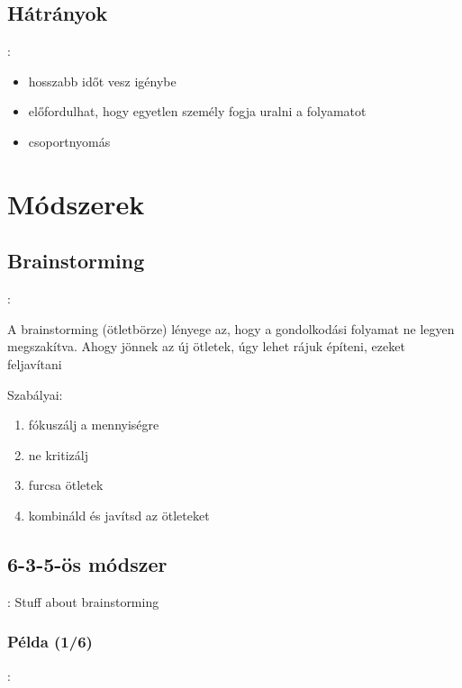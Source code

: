 \documentclass{beamer}
\begin{document}
\subsection{Hátrányok}
\begin{frame}{\secname : \subsecname}
    \begin{itemize}
        \item hosszabb időt vesz igénybe
        \item előfordulhat, hogy egyetlen személy fogja uralni a folyamatot
        \item csoportnyomás
    \end{itemize}
\end{frame}


\section{Módszerek}

\subsection{Brainstorming}
\begin{frame}{\secname : \subsecname}

A brainstorming (ötletbörze) lényege az, hogy a gondolkodási folyamat ne legyen megszakítva. Ahogy jönnek az új ötletek, úgy lehet rájuk építeni,
ezeket feljavítani

Szabályai:
\begin{enumerate}
    \item fókuszálj a mennyiségre
    \item ne kritizálj
    \item furcsa ötletek 
    \item kombináld és javítsd az ötleteket
\end{enumerate}
\end{frame}

\subsection{6-3-5-ös módszer}
\begin{frame}{\secname : \subsecname}
    Stuff about brainstorming
\end{frame}

\subsubsection{Példa (1/6)}
\begin{frame}{\subsecname : \subsubsecname}
    
\end{frame}
\end{document}
